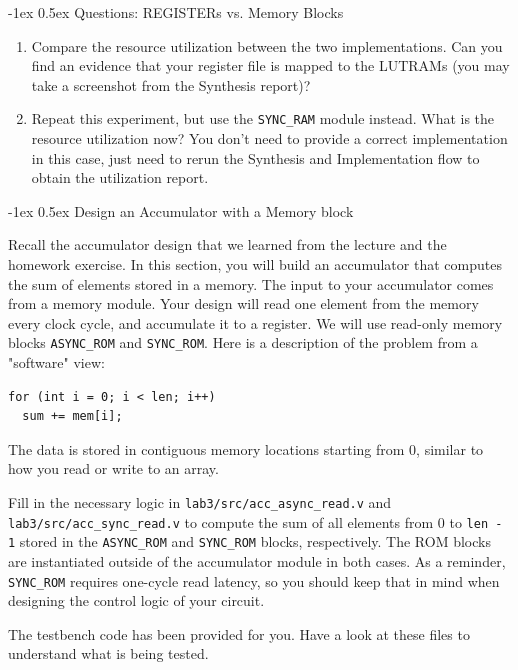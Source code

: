 \documentclass[11pt]{article}
\makeatletter
\renewcommand{\subsection}
{\@startsection {subsection}{1}{0pt}
 {-1ex}
 {0.5ex}
 {\bfseries\normalsize}}
\makeatother
\begin{document}
{\subsection{Questions: REGISTERs vs. Memory Blocks}\label{sec:Q2}
\begin{enumerate}
\item Compare the resource utilization between the two implementations. Can you find an evidence that your register file is mapped to the LUTRAMs (you may take a screenshot from the Synthesis report)?
\item Repeat this experiment, but use the \texttt{SYNC\_RAM} module instead. What is the resource utilization now? You don't need to provide a correct implementation in this case, just need to rerun the Synthesis and Implementation flow to obtain the utilization report.
\end{enumerate}
\subsection{Design an Accumulator with a Memory block}

Recall the accumulator design that we learned from the lecture and the homework exercise. In this section, you will build an accumulator that computes the sum of elements stored in a memory. The input to your accumulator comes from a memory module. Your design will read one element from the memory every clock cycle, and accumulate it to a register. We will use read-only memory blocks \verb|ASYNC_ROM| and \verb|SYNC_ROM|. Here is a description of the problem from a "software" view:

\begin{verbatim}
for (int i = 0; i < len; i++)
  sum += mem[i];
\end{verbatim}

The data is stored in contiguous memory locations starting from 0, similar to how you read or write to an array.

Fill in the necessary logic in \verb|lab3/src/acc_async_read.v| and \verb|lab3/src/acc_sync_read.v| to compute the sum of all elements from 0 to \verb|len - 1| stored in the \verb|ASYNC_ROM| and \verb|SYNC_ROM| blocks, respectively. The ROM blocks are instantiated outside of the accumulator module in both cases. As a reminder, \verb|SYNC_ROM| requires one-cycle read latency, so you should keep that in mind when designing the control logic of your circuit.

The testbench code has been provided for you. Have a look at these files to understand what is being tested.

}
\end{document}
